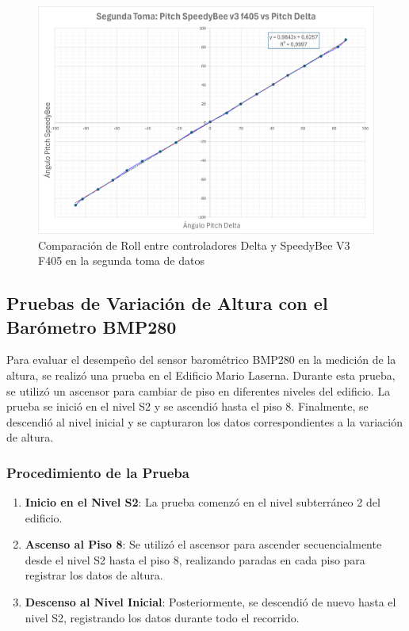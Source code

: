             \begin{figure}[H]
                \centering
                \includegraphics[width=5.5 in]{Imagenes/Pruebas/pitch_2_compare.png}
                \caption{Comparación de Roll entre controladores Delta y SpeedyBee V3 F405 en la segunda toma de datos }
                \label{fig:comparacionPitch2}
            \end{figure}


    \subsection{Pruebas de Variación de Altura con el Barómetro BMP280}

        Para evaluar el desempeño del sensor barométrico BMP280 en la medición de la altura, se realizó una prueba en el Edificio Mario Laserna. Durante esta prueba, se utilizó un ascensor para cambiar de piso en diferentes niveles del edificio. La prueba se inició en el nivel S2 y se ascendió hasta el piso 8. Finalmente, se descendió al nivel inicial y se capturaron los datos correspondientes a la variación de altura.

        \subsubsection{Procedimiento de la Prueba}

            \begin{enumerate}
                \item \textbf{Inicio en el Nivel S2}: La prueba comenzó en el nivel subterráneo 2 del edificio.
                \item \textbf{Ascenso al Piso 8}: Se utilizó el ascensor para ascender secuencialmente desde el nivel S2 hasta el piso 8, realizando paradas en cada piso para registrar los datos de altura.
                \item \textbf{Descenso al Nivel Inicial}: Posteriormente, se descendió de nuevo hasta el nivel S2, registrando los datos durante todo el recorrido.
            \end{enumerate}

